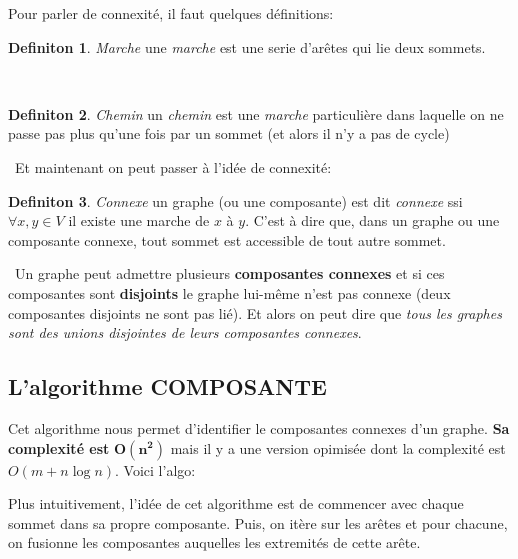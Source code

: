 \documentclass[french]{article}
\theoremstyle{definition}
\newtheorem{definition}{Definiton}[subsection]
\begin{document}
		Pour parler de connexité, il faut quelques définitions:
		\\
		\begin{definition}{\textit{Marche}}
			une \textit{marche} est une serie d'arêtes qui lie deux sommets.
		\end{definition}
		\
		\begin{definition}{\textit{Chemin}}
			un \textit{chemin} est une \textit{marche} particulière dans laquelle on ne passe pas plus qu'une fois par un sommet (et alors il n'y a pas de cycle)
		\end{definition}
		\
		Et maintenant on peut passer à l'idée de connexité: 
		\\
		\begin{definition}{\textit{Connexe}}
			un graphe (ou une composante) est dit \textit{connexe} ssi $\forall x,y \in V$ il existe une marche de $x$ à $y$. C'est à dire que, dans un graphe ou une composante connexe, tout sommet est accessible de tout autre sommet.
		\end{definition}
		\
		Un graphe peut admettre plusieurs \textbf{composantes connexes} et si ces composantes sont \textbf{disjoints} le graphe lui-même n'est pas connexe (deux composantes disjoints ne sont pas lié). Et alors on peut dire que \textit{tous les graphes sont des unions disjointes de leurs composantes connexes}.

		\subsection{L'algorithme COMPOSANTE}
		Cet algorithme nous permet d'identifier le composantes connexes d'un graphe. \textbf{Sa complexité est} $\mathbf{O(n^2)}$ mais il y a une version opimisée dont la complexité est $O(m + n \log n)$. Voici l'algo:
		\begin{algorithmic}[1]
			\FORALL{$x \in V$} 
			\STATE{$\text{comp}(x) \leftarrow x$}
			\ENDFOR
					\ENDIF
				\ENDFOR
				\ENDIF
			\ENDFOR
		\end{algorithmic}
		
		Plus intuitivement, l'idée de cet algorithme est de commencer avec chaque sommet dans sa propre composante. Puis, on itère sur les arêtes et pour chacune, on fusionne les composantes auquelles les extremités de cette arête.
\end{document}
